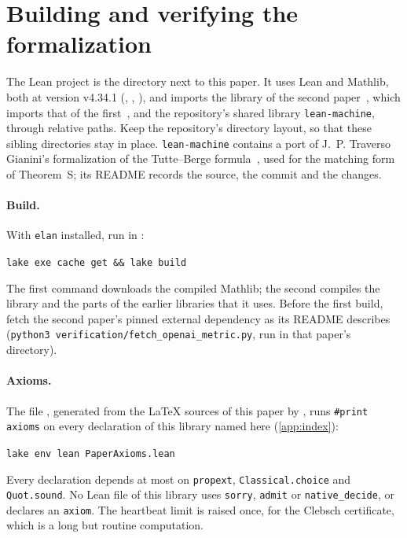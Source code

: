 \section{Building and verifying the formalization}\label{app:verify}

The Lean project is the directory  next to this paper. It uses Lean and Mathlib, both at version v4.34.1
(, , ), and imports the library of the second
paper~\cite{SecondPaper2026}, which imports that of the first~\cite{FirstPaper2026}, and the repository's shared library
\texttt{lean-machine}, through relative paths. Keep the repository's directory layout, so that these sibling directories
stay in place. \texttt{lean-machine} contains a port of J.~P. Traverso Gianini's formalization of the Tutte--Berge
formula~\cite{TraversoGianini2026}, used for the matching form of Theorem~S; its README records the source, the commit
and the changes.

\paragraph{Build.} With \texttt{elan} installed, run in :
\begin{center}
\texttt{lake exe cache get \&\& lake build}
\end{center}
The first command downloads the compiled Mathlib; the second compiles the library and the parts of the earlier libraries
that it uses. Before the first build, fetch the second paper's pinned external dependency as its README describes
(\texttt{python3 verification/fetch\_openai\_metric.py}, run in that paper's directory).

\paragraph{Axioms.} The file , generated from the \LaTeX{} sources of this paper by
, runs \texttt{\#print axioms} on every declaration of this library named here (\cref{app:index}):
\begin{center}
\texttt{lake env lean PaperAxioms.lean}
\end{center}
Every declaration depends at most on \texttt{propext}, \texttt{Classical.choice} and \texttt{Quot.sound}. No Lean file of this
library uses \texttt{sorry}, \texttt{admit} or \texttt{native\_decide}, or declares an \texttt{axiom}. The heartbeat limit is
raised once, for the Clebsch certificate, which is a long but routine computation.

